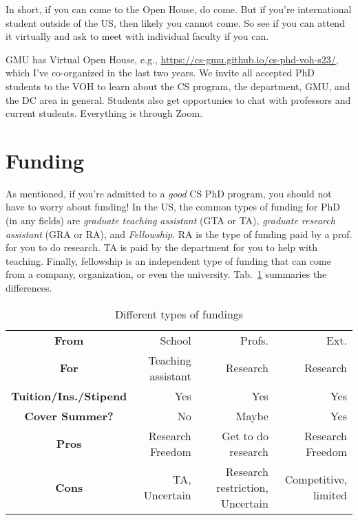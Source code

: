 \documentclass[10pt]{article}
\begin{document}
In short, if you can come to the Open House, do come.  But if you're international student outside of the US, then likely you cannot come.  So see if you can attend it virtually and ask to meet with individual faculty if you can.

\begin{tcolorbox}[left=1pt,right=1pt,top=1pt,bottom=1pt]
GMU has Virtual Open House, e.g., \url{https://cs-gmu.github.io/cs-phd-voh-s23/}, which I've co-organized in the last two years. We invite all accepted PhD students to the VOH to learn about the CS program, the department, GMU, and the DC area in general. Students also get opportunies to chat with professors and current students.  Everything is through Zoom.
\end{tcolorbox}



\section{Funding}

As mentioned, if you're admitted to a \emph{good} CS PhD program, you should not have to worry about funding!  
In the US, the common types of funding for PhD (in any fields) are \emph{graduate teaching assistant} (GTA or TA), \emph{graduate research assistant} (GRA or RA), and \emph{Fellowship}.
RA is the type of funding paid by a prof. for you to do research. TA is paid by the department for you to help with teaching. Finally, fellowship is an independent type of funding that can come from a company, organization, or even the university.
Tab.~\ref{tab:funding} summaries the differences.

\begin{table}
  \centering
  \caption{Different types of fundings}\label{tab:funding}
  \begin{tabular}{c|r|r|r}
    \toprule
    \textbf{From} & School & Profs. & Ext.\\
    \textbf{For}                  & Teaching assistant       & Research                        & Research                              \\
    \textbf{Tuition/Ins./Stipend} & Yes                      & Yes                             & Yes                                   \\
    \textbf{Cover Summer?}              & No                       & Maybe                           & Yes                                   \\
    \midrule
    \textbf{Pros}                 & Research Freedom         & Get to do research              & Research Freedom                      \\
    \textbf{Cons}                 & TA, Uncertain            & Research restriction, Uncertain & Competitive, limited             \\
    \bottomrule
  \end{tabular}
\end{table}
\end{document}
